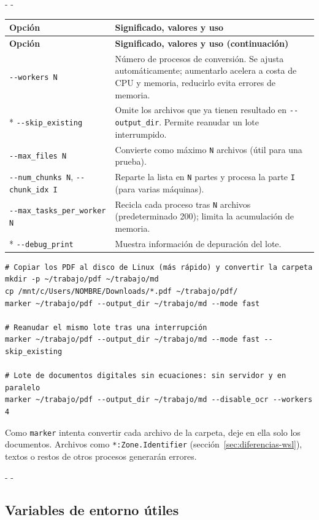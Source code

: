 \documentclass[11pt,a4paper]{article}
\makeatletter
\newcommand{\necesitaespacio}[1]{\par\penalty-100\begingroup
	\setlength{\dimen@}{#1}\dimen@ii\pagegoal\advance\dimen@ii-\pagetotal
	\ifdim\dimen@>\dimen@ii\ifdim\dimen@ii>\z@\vfil\fi\penalty-\@M\fi\endgroup}
\newenvironment{opciones}[1][Opción]{%
	\par\begingroup\small
	\begin{longtable}{L{4.25cm}L{11.2cm}}
		\toprule\rowcolor{tablacab}\cab{#1} & \cab{Significado, valores y uso} \\ \midrule
		\endfirsthead
		\toprule\rowcolor{tablacab}\cab{#1} & \cab{Significado, valores y uso (continuación)} \\ \midrule
		\endhead
		\bottomrule
		\endfoot}
	{\end{longtable}\endgroup}
\newcommand{\cmd}[1]{\texttt{\textcolor{colcmd}{#1}}}      %
\newcommand{\opt}[1]{\texttt{\textcolor{colopt}{#1}}}      %
\newcommand{\arch}[1]{\texttt{\textcolor{colarch}{#1}}}    %
\newcommand{\val}[1]{\texttt{#1}}                          %
\newcommand{\cab}[1]{\textbf{#1}}
\makeatother
\begin{document}
	\necesitaespacio{18\baselineskip}
	\begin{opciones}
		\opt{-{}-workers N} & Número de procesos de conversión. Se ajusta automáticamente; aumentarlo acelera a costa de CPU y memoria, reducirlo evita errores de memoria.\\*
		\opt{-{}-skip\_\allowbreak{}existing} & Omite los archivos que ya tienen resultado en \opt{-{}-output\_dir}. Permite reanudar un lote interrumpido.\\
		\opt{-{}-max\_files N} & Convierte como máximo \val{N} archivos (útil para una prueba).\\
		\opt{-{}-num\_\allowbreak{}chunks N}, \opt{-{}-chunk\_idx I} & Reparte la lista en \val{N} partes y procesa la parte \val{I} (para varias máquinas).\\
		\opt{-{}-max\_\allowbreak{}tasks\_\allowbreak{}per\_\allowbreak{}worker N} & Recicla cada proceso tras \val{N} archivos (predeterminado 200); limita la acumulación de memoria.\\*
		\opt{-{}-debug\_print} & Muestra información de depuración del lote.\\
	\end{opciones}
	
	\begin{lstlisting}
# Copiar los PDF al disco de Linux (más rápido) y convertir la carpeta
mkdir -p ~/trabajo/pdf ~/trabajo/md
cp /mnt/c/Users/NOMBRE/Downloads/*.pdf ~/trabajo/pdf/
marker ~/trabajo/pdf --output_dir ~/trabajo/md --mode fast

# Reanudar el mismo lote tras una interrupción
marker ~/trabajo/pdf --output_dir ~/trabajo/md --mode fast --skip_existing

# Lote de documentos digitales sin ecuaciones: sin servidor y en paralelo
marker ~/trabajo/pdf --output_dir ~/trabajo/md --disable_ocr --workers 4
\end{lstlisting}
	
	\begin{advertencia}
		Como \cmd{marker} intenta convertir cada archivo de la carpeta, deje en ella solo los documentos. Archivos como \arch{*:Zone.Identifier} (sección~\ref{sec:diferencias-wsl}), textos o restos de otros procesos generarán errores.
	\end{advertencia}
	
	\necesitaespacio{29\baselineskip}
	\subsection{Variables de entorno útiles}\label{sec:marker-variables}
	
\end{document}
